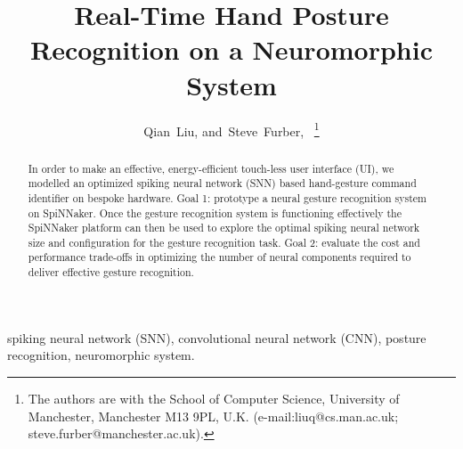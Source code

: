 \documentclass[journal]{journal}
\begin{document}
\title{Real-Time Hand Posture Recognition on a Neuromorphic System}
\author{
Qian~Liu, 
and~Steve~Furber,~
\thanks{
The authors are with the School of Computer Science, University of Manchester, Manchester M13 9PL, U.K. 
(e-mail:liuq@cs.man.ac.uk; steve.furber@manchester.ac.uk).}
}%

\maketitle
\thispagestyle{empty}

\begin{abstract}
In order to make an effective, energy-efficient touch-less user interface (UI), we modelled an optimized spiking neural network (SNN) based hand-gesture command identifier on bespoke hardware. 
Goal 1:  prototype a neural gesture recognition system on SpiNNaker. 
Once the gesture recognition system is functioning effectively the SpiNNaker platform can then be used to explore the optimal spiking neural network size and configuration for the gesture recognition task.
Goal 2:  evaluate the cost and performance trade-offs in optimizing the number of neural components required to deliver effective gesture recognition.
\end{abstract}

\begin{IEEEkeywords}
spiking neural network (SNN), convolutional neural network (CNN), posture recognition, neuromorphic system.
\end{IEEEkeywords}
\end{document}
